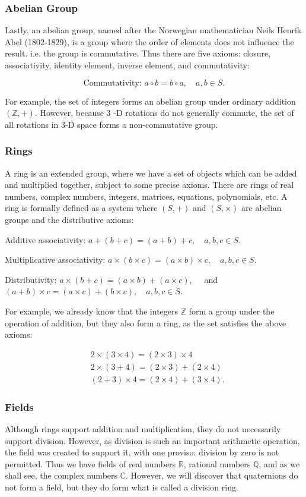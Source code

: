 \documentclass[10pt]{article}
\begin{document}
\subsubsection{Abelian Group}
Lastly, an abelian group, named after the Norwegian mathematician Neils Henrik Abel (1802-1829), is a group where the order of elements does not influence the result. i.e. the group is commutative. Thus there are five axioms: closure, associativity, identity element, inverse element, and commutativity:

$$
\text { Commutativity: } a \circ b=b \circ a, \quad a, b \in S \text {. }
$$

For example, the set of integers forms an abelian group under ordinary addition $(\mathbb{Z},+)$. However, because 3 -D rotations do not generally commute, the set of all rotations in 3-D space forms a non-commutative group.

\subsubsection{Rings}
A ring is an extended group, where we have a set of objects which can be added and multiplied together, subject to some precise axioms. There are rings of real numbers, complex numbers, integers, matrices, equations, polynomials, etc. A ring is formally defined as a system where $(S,+)$ and $(S, \times)$ are abelian groups and the distributive axioms:

Additive associativity: $a+(b+c)=(a+b)+c, \quad a, b, c \in S$.

Multiplicative associativity: $a \times(b \times c)=(a \times b) \times c, \quad a, b, c \in S$.

Distributivity: $a \times(b+c)=(a \times b)+(a \times c), \quad$ and $(a+b) \times c=(a \times c)+(b \times c), \quad a, b, c \in S$.

For example, we already know that the integers $\mathbb{Z}$ form a group under the operation of addition, but they also form a ring, as the set satisfies the above axioms:

$$
\begin{aligned}
& 2 \times(3 \times 4)=(2 \times 3) \times 4 \\
& 2 \times(3+4)=(2 \times 3)+(2 \times 4) \\
& (2+3) \times 4=(2 \times 4)+(3 \times 4) .
\end{aligned}
$$

\subsubsection{Fields}
Although rings support addition and multiplication, they do not necessarily support division. However, as division is such an important arithmetic operation, the field was created to support it, with one proviso: division by zero is not permitted. Thus we have fields of real numbers $\mathbb{R}$, rational numbers $\mathbb{Q}$, and as we shall see, the complex numbers $\mathbb{C}$. However, we will discover that quaternions do not form a field, but they do form what is called a division ring.
\end{document}
